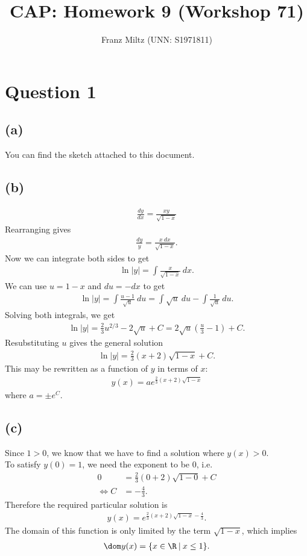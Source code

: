 \documentclass{article}
\title{CAP: Homework 9 (Workshop 71)}
\author{Franz Miltz (UNN: S1971811)}
\begin{document}
\maketitle
\section*{Question 1}
\subsection*{(a)}
You can find the sketch attached to this document.
\subsection*{(b)}
\begin{align*}
  \frac{dy}{dx}=\frac{xy}{\sqrt{1-x}}
\end{align*}
Rearranging gives
\begin{align*}
  \frac{dy}{y}=\frac{x\:dx}{\sqrt{1-x}}.
\end{align*}
Now we can integrate both sides to get
\begin{align*}
  \ln|y| = \int \frac{x}{\sqrt{1-x}}\:dx.
\end{align*}
We can use $u=1-x$ and $du=-dx$ to get
\begin{align*}
  \ln|y| = \int \frac{u-1}{\sqrt{u}}\:du=\int \sqrt{u}\:du - \int \frac{1}{\sqrt{u}}\:du.
\end{align*}
Solving both integrals, we get
\begin{align*}
  \ln|y|=\frac{2}{3}u^{2/3}-2\sqrt{u}+C=2\sqrt{u}\left(\frac{u}{3}-1\right)+C.
\end{align*}
Resubstituting $u$ gives the general solution
\begin{align*}
  \ln|y|=\frac{2}{3}(x+2)\sqrt{1-x}+C.
\end{align*}
This may be rewritten as a function of $y$ in terms of $x$:
\begin{align*}
  y(x)=  ae^{\frac{2}{3}(x+2)\sqrt{1-x}}
\end{align*}
where $a=\pm e^C$.
\subsection*{(c)}
Since $1>0$, we know that we have to find a solution where $y(x)>0$.\\
To satisfy $y(0)=1$, we need the exponent to be $0$, i.e.
\begin{align*}
  0                 & =\frac{2}{3}(0+2)\sqrt{1-0}+C \\
  \Leftrightarrow C & = -\frac{4}{3}.
\end{align*}
Therefore the required particular solution is
\begin{align*}
  y(x)=e^{\frac{2}{3}(x+2)\sqrt{1-x}-\frac{4}{3}}.
\end{align*}
The domain of this function is only limited by the term $\sqrt{1-x}$, which implies \begin{align*}
  \dom y(x) = \{x\in\R\:|\: x\leq 1\}.
\end{align*}
\end{document}
